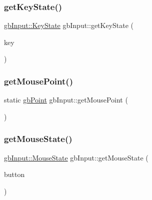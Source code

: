 \subsubsection{\texorpdfstring{getKeyState()}{getKeyState()}}
{\footnotesize\ttfamily \mbox{\hyperlink{classgb_input_af8c222f97119246c7b6e3c127a47a5bb}{gb\+Input\+::\+Key\+State}} gb\+Input\+::get\+Key\+State (\begin{DoxyParamCaption}\item[{S\+D\+L\+\_\+\+Keycode}]{key }\end{DoxyParamCaption})\hspace{0.3cm}{\ttfamily [static]}}

\mbox{\label{classgb_input_af55c74957fdc9148e331ff662c612c9d}} 
\subsubsection{\texorpdfstring{getMousePoint()}{getMousePoint()}}
{\footnotesize\ttfamily static \mbox{\hyperlink{classgb_point}{gb\+Point}} gb\+Input\+::get\+Mouse\+Point (\begin{DoxyParamCaption}{ }\end{DoxyParamCaption})\hspace{0.3cm}{\ttfamily [static]}}

\mbox{\label{classgb_input_accf6fe3ece1c770b30c83644ff6b473d}} 
\subsubsection{\texorpdfstring{getMouseState()}{getMouseState()}}
{\footnotesize\ttfamily \mbox{\hyperlink{classgb_input_adf80e0206ecdf62ba8c55e9d5ac9c290}{gb\+Input\+::\+Mouse\+State}} gb\+Input\+::get\+Mouse\+State (\begin{DoxyParamCaption}\item[{\mbox{\hyperlink{classgb_input_a8b92d031046a9cc8e432684fae3ee398}{Mouse\+Button}}}]{button }\end{DoxyParamCaption})\hspace{0.3cm}{\ttfamily [static]}}

\mbox{\label{classgb_input_a1c1bd55741717af5ab438340da8d6856}} 
